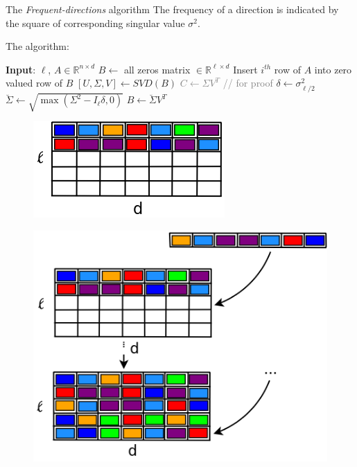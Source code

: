 \documentclass[first=dgreen,second=purple,logo=redque]{aaltoslides}
\begin{document}
\begin{frame}[allowframebreaks=1]{The \textit{Frequent-directions} algorithm}
The \textcolor{dgreen}{frequency} of a direction is indicated by the square of corresponding singular value $\sigma^2$.

\framebreak
The algorithm:
  \begin{algorithmic}
    \State \textbf{Input}: $\ell$, $A \in \mathbb{R}^{n\times d}$
    \State $B \leftarrow $ all zeros matrix $\in \mathbb{R}^{\ell\times d}$
    \State Insert $i^{th}$ row of $A$ into zero valued row of $B$
      \State $[U,\Sigma,V] \leftarrow SVD(B)$
      \textcolor{gray}{\State $C \leftarrow \Sigma V^T$ // for proof}
      \State $\delta \leftarrow \sigma_{\ell/2}^2$
      \State $\breve{\Sigma} \leftarrow \sqrt{\max(\Sigma^2-I_\ell\delta,0)}$
      \State $B\leftarrow \breve{\Sigma}V^T$
    \EndIf
    \EndFor
  \end{algorithmic}
  
\framebreak

\begin{figure}
  \includegraphics[scale=0.45]{plots/fd1}
 \label{fig:fd1}
\end{figure}

\framebreak

\begin{figure}
  \includegraphics[scale=0.35]{plots/fd2}
 \label{fig:fd2}
\end{figure}


\end{frame}
\end{document}
